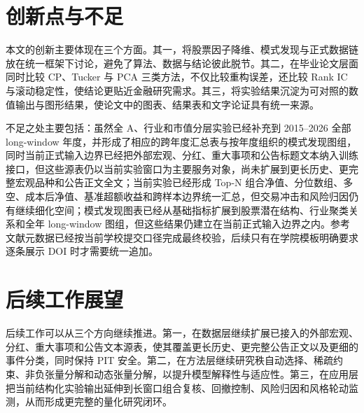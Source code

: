 \section{创新点与不足}

本文的创新主要体现在三个方面。其一，将股票因子降维、模式发现与正式数据链放在统一框架下讨论，避免了算法、数据与结论彼此脱节。其二，在毕业论文层面同时比较 CP、Tucker 与 PCA 三类方法，不仅比较重构误差，还比较 Rank IC 与滚动稳定性，使结论更贴近金融研究需求。其三，将实验结果沉淀为可对照的数值输出与图形结果，使论文中的图表、结果表和文字论证具有统一来源。

不足之处主要包括：虽然全 A、行业和市值分层实验已经补充到 2015--2026 全部 long-window 年度，并形成了相应的跨年度汇总表与按年度组织的模式发现图组，同时当前正式输入边界已经把外部宏观、分红、重大事项和公告标题文本纳入训练接口，但这些源表仍以当前实验窗口为主要服务对象，尚未扩展到更长历史、更完整宏观品种和公告正文全文；当前实验已经形成 Top-N 组合净值、分位数组、多空、成本后净值、基准超额收益和跨样本边界统一汇总，但交易冲击和风险归因仍有继续细化空间；模式发现图表已经从基础指标扩展到股票潜在结构、行业聚类关系和全年 long-window 图组，但这些结果仍建立在当前正式输入边界之内。参考文献元数据已经按当前学校提交口径完成最终校验，后续只有在学院模板明确要求逐条展示 DOI 时才需要统一追加。

\section{后续工作展望}

后续工作可以从三个方向继续推进。第一，在数据层继续扩展已接入的外部宏观、分红、重大事项和公告文本源表，使其覆盖更长历史、更完整公告正文以及更细的事件分类，同时保持 PIT 安全。第二，在方法层继续研究秩自动选择、稀疏约束、非负张量分解和动态张量分解，以提升模型解释性与适应性。第三，在应用层把当前结构化实验输出延伸到长窗口组合复核、回撤控制、风险归因和风格轮动监测，从而形成更完整的量化研究闭环。

